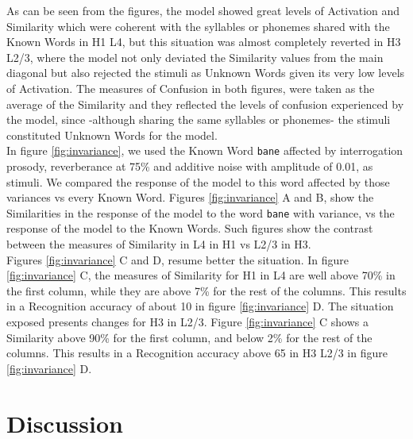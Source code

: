 \documentclass[11pt,a4paper]{article}
\begin{document}
As can be seen from the figures, the model showed great levels of Activation and Similarity which were coherent
with the syllables or phonemes shared with the Known Words in H1 L4, but this situation was almost completely
reverted in H3 L2/3,
where the model not only deviated the Similarity values from the main diagonal but also
rejected the stimuli as Unknown Words given its very low levels of Activation.
The measures of Confusion in both figures, were taken as the average of the Similarity and
they reflected the levels of confusion experienced by the model, since
-although sharing the same syllables or phonemes- the stimuli constituted Unknown Words for the model.\\

In figure \ref{fig:invariance}, we used the Known Word \texttt{bane} affected by interrogation prosody,
reverberance at 75\% and additive noise with amplitude of 0.01, as stimuli.
We compared the response of the model to this word affected by those variances
vs every Known Word.
Figures \ref{fig:invariance} A and B, show the Similarities in the response
of the model to the word \texttt{bane} with variance, vs
the response of the model to the Known Words.
Such figures show the contrast between the measures of Similarity
in L4 in H1 vs L2/3 in H3.\\

Figures \ref{fig:invariance} C and D, resume better the situation.
In figure \ref{fig:invariance} C, the measures of Similarity for H1 in L4
are well above 70\% in the first column, while they are above 7\%
for the rest of the columns.
This results in a Recognition accuracy of about 10 in figure \ref{fig:invariance} D.
The situation exposed presents changes for H3 in L2/3.
Figure \ref{fig:invariance} C shows a Similarity above 90\% for the first column, and
below 2\% for the rest of the columns.
This results in a Recognition accuracy above 65 in H3 L2/3 in figure \ref{fig:invariance} D.\\























\section{Discussion} \label{Dis}
\end{document}

